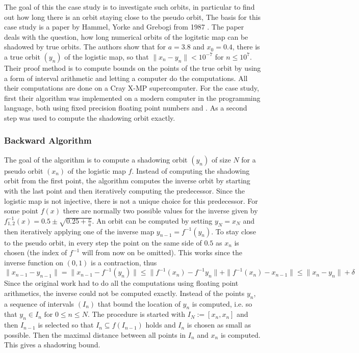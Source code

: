     The goal of this the case study is to investigate such orbits, in particular to find out how long there is an orbit staying close to the pseudo orbit,
    The basis for this case study is a paper by Hammel, Yorke and Grebogi from 1987 \cite{Hammel1987}.
    The paper deals with the question, how long numerical orbits of the logitstic map can be shadowed by true orbits.
    The authors show that for $a = 3.8$ and $x_0 = 0.4$, there is a true orbit $(y_n)$ of the logistic map, so that $\| x_n - y_n \| < 10^{-7}$ for $n \leq 10^7$.
    Their proof method is to compute bounds on the points of the true orbit by using a form of interval arithmetic and letting a computer do the computations. 
    All their computations are done on a Cray X-MP supercomputer. 
    For the case study, first their algorithm was implemented on a modern computer in the \cc programming language, both using fixed precision floating point numbers and \irram. 
    As a second step \irram was used to compute the shadowing orbit exactly.
  \subsubsection{Backward Algorithm}
    The goal of the algorithm is to compute a shadowing orbit $(y_n)$ of size $N$ for a pseudo orbit $(x_n)$ of the logistic map $f$.
    Instead of computing the shadowing orbit from the first point, the algorithm computes the inverse orbit by starting with the last point and then iteratively computing the predecessor. 
    Since the logistic map is not injective, there is not a unique choice for this predecessor. 
    For some point $f(x)$ there are normally two possible values for the inverse given by $f^{-1}_{1,2}(x) = 0.5 \pm \sqrt{0.25 + \frac{x}{a}} $.
    An orbit can be computed by setting $y_N = x_N$ and then iteratively applying one of the inverse map $y_{n-1} = f^{-1}(y_n)$.   To stay close to the pseudo orbit, in every step the point on the same side of $0.5$ as $x_n$ is chosen (the index of $f^{-1}$ will from now on be omitted). 
    This works since the inverse function on $(0,1)$ is a contraction, thus
    $$ \| x_{n-1} - y_{n-1} \| = \| x_{n-1} - f^{-1}(y_n) \| \leq \| f^{-1}(x_n) - f^{-1}{y_n} \| + \| f^{-1}(x_n) - x_{n-1} \| \leq \| x_n - y_n \| + \delta $$   
    Since the original work had to do all the computations using floating point arithmetics, the inverse could not be computed exactly.
    Instead of the points $y_n$, a sequence of intervals $(I_n)$ that bound the location of $y_n$ is computed, i.e. so that $y_n \in I_n \text{ for } 0 \leq n \leq N$.
    The procedure is started with $I_N := [x_n, x_n]$ and then $I_{n-1}$ is selected so that $I_n \subseteq f(I_{n-1})$ holds and $I_n$ is chosen as small as possible. 
    Then the maximal distance between all points in $I_n$ and $x_n$ is computed.
    This gives a shadowing bound.

